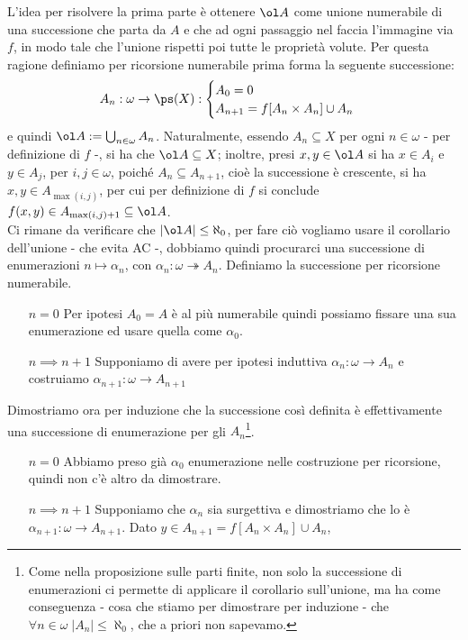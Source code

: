 \begin{soln}[DA COMPLETARE]
	L'idea per risolvere la prima parte è ottenere $\ol A$ come unione numerabile di una successione che parta da $A$ e che ad ogni passaggio nel faccia l'immagine via $f$, in modo tale che l'unione rispetti poi tutte le proprietà volute.
	Per questa ragione definiamo per ricorsione numerabile prima forma la seguente successione:
	\[ A_n : \omega \to \ps(X) : \begin{cases}
		A_0 = 0 \\
		A_{n + 1} = f[A_n \times A_n] \cup A_n
	\end{cases}
		\]
	e quindi $\ol A := \bigcup_{n \in \omega} A_n$. Naturalmente, essendo $A_n \subseteq X$ per ogni $n \in \omega$ - per definizione di $f$ -, si ha che $\ol A \subseteq X$; inoltre, presi $x,y \in \ol A$ si ha $x \in A_i$ e $y \in A_j$, per $i, j \in \omega$, poiché $A_n \subseteq A_{n + 1}$, cioè la successione è crescente,
	si ha $x,y \in A_{\max(i,j)}$, per cui per definizione di $f$ si conclude $f(x,y) \in A_{\max(i,j) + 1} \subseteq \ol A$.\\
	Ci rimane da verificare che $|\ol A| \leq \aleph_0$, per fare ciò vogliamo usare il corollario dell'unione - che evita AC -, dobbiamo quindi procurarci una 
	successione di enumerazioni $n \mapsto \alpha_n$, con $\alpha_n : \omega \twoheadrightarrow A_n$. Definiamo la successione per ricorsione numerabile.
	\begin{itemize}
		\item[$\boxed{n = 0}$] Per ipotesi $A_0 = A$ è al più numerabile quindi possiamo fissare una sua enumerazione ed usare quella come $\alpha_0$.
		\item[$\boxed{n \implies n + 1}$] Supponiamo di avere per ipotesi induttiva $\alpha_n : \omega \to A_n$ e costruiamo $\alpha_{n + 1} : \omega \to A_{n + 1}$
	\end{itemize}
	Dimostriamo ora per induzione che la successione così definita è effettivamente una successione di enumerazione per gli $A_n$\footnote{Come nella proposizione
	sulle parti finite, non solo la successione di enumerazioni ci permette di applicare il corollario sull'unione, ma ha come conseguenza - cosa che stiamo per dimostrare per induzione - che $\forall n \in \omega \; |A_n| \leq \aleph_0$, che a priori non sapevamo.}.
	\begin{itemize}
		\item[$\boxed{n = 0}$] Abbiamo preso già $\alpha_0$ enumerazione nelle costruzione per ricorsione, quindi non c'è altro da dimostrare.
		\item[$\boxed{n \implies n + 1}$] Supponiamo che $\alpha_n$ sia surgettiva e dimostriamo che lo è $\alpha_{n + 1} : \omega \to A_{n + 1}$. Dato $y \in A_{n + 1} = f[A_n \times A_n] \cup A_n$,

\end{itemize}
\end{soln}
